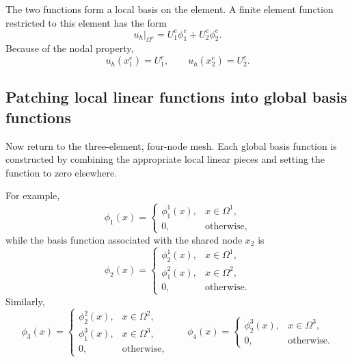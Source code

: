 \documentclass[11pt]{article}
\newcommand{\Om}{\Omega}
\begin{document}
The two functions form a local basis on the element. A finite element function
restricted to this element has the form
\begin{equation}
u_h|_{\Om^e}=U_1^e\phi_1^e+U_2^e\phi_2^e.
\label{eq:local-linear-interpolation}
\end{equation}
Because of the nodal property,
\[
u_h(x_1^e)=U_1^e,
\qquad
u_h(x_2^e)=U_2^e.
\]

\subsection{Patching local linear functions into global basis functions}

Now return to the three-element, four-node mesh. Each global basis function is
constructed by combining the appropriate local linear pieces and setting the
function to zero elsewhere.

For example,
\[
\phi_1(x)=
\begin{cases}
\phi_1^1(x), & x\in\Om^1,\\
0, & \text{otherwise},
\end{cases}
\]
while the basis function associated with the shared node $x_2$ is
\[
\phi_2(x)=
\begin{cases}
\phi_2^1(x), & x\in\Om^1,\\
\phi_1^2(x), & x\in\Om^2,\\
0, & \text{otherwise}.
\end{cases}
\]
Similarly,
\[
\phi_3(x)=
\begin{cases}
\phi_2^2(x), & x\in\Om^2,\\
\phi_1^3(x), & x\in\Om^3,\\
0, & \text{otherwise},
\end{cases}
\qquad
\phi_4(x)=
\begin{cases}
\phi_2^3(x), & x\in\Om^3,\\
0, & \text{otherwise}.
\end{cases}
\]

\begin{center}
\end{center}
\end{document}
